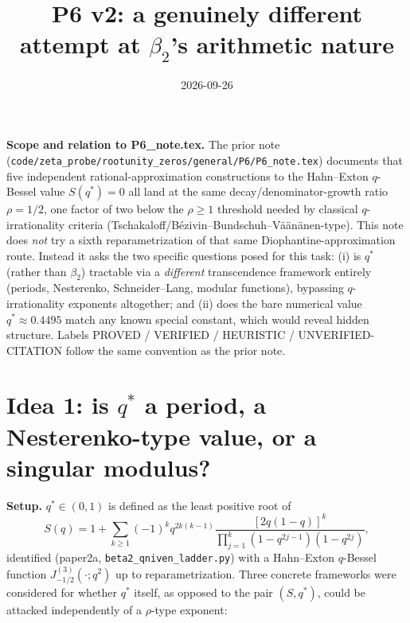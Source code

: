 \documentclass[11pt]{article}
\title{P6 v2: a genuinely different attempt at $\beta_2$'s arithmetic nature}
\author{}
\date{2026-09-26}
\begin{document}
\maketitle

\noindent\textbf{Scope and relation to P6\_note.tex.} The prior note
(\texttt{code/zeta\_probe/rootunity\_zeros/general/P6/P6\_note.tex}) documents that five
independent rational-approximation constructions to the Hahn--Exton $q$-Bessel value
$S(q^\ast)=0$ all land at the same decay/denominator-growth ratio $\rho=1/2$, one factor of two
below the $\rho\ge1$ threshold needed by classical $q$-irrationality criteria
(Tschakaloff/Bézivin--Bundschuh--Väänänen-type). This note does \emph{not} try a sixth
reparametrization of that same Diophantine-approximation route. Instead it asks the two
specific questions posed for this task: (i) is $q^\ast$ (rather than $\beta_2$) tractable via a
\emph{different} transcendence framework entirely (periods, Nesterenko, Schneider--Lang,
modular functions), bypassing $q$-irrationality exponents altogether; and (ii) does the bare
numerical value $q^\ast\approx0.4495$ match any known special constant, which would reveal
hidden structure. Labels PROVED / VERIFIED / HEURISTIC / UNVERIFIED-CITATION follow the same
convention as the prior note.

\section{Idea 1: is $q^\ast$ a period, a Nesterenko-type value, or a singular modulus?}

\textbf{Setup.} $q^\ast\in(0,1)$ is defined as the least positive root of
\[
S(q) = 1+\sum_{k\ge1}(-1)^k q^{2k(k-1)}\frac{[2q(1-q)]^k}{\prod_{j=1}^k(1-q^{2j-1})(1-q^{2j})},
\]
identified (paper2a, \texttt{beta2\_qniven\_ladder.py}) with a Hahn--Exton $q$-Bessel function
$J^{(3)}_{-1/2}(\cdot;q^2)$ up to reparametrization. Three concrete frameworks were considered
for whether $q^\ast$ itself, as opposed to the pair $(S,q^\ast)$, could be attacked
independently of a $\rho$-type exponent:
\end{document}
